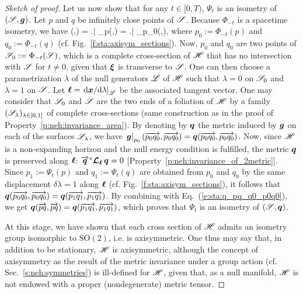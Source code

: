 \begin{proof}[Sketch of proof]
Let us now show that for any $t\in[0,T)$, %
$\Psi_t$ is an isometry of $(\mathscr{S},\bm{g})$.
Let $p$ and $q$ be infinitely close points of $\mathscr{S}$. Because $\Phi_{-t}$ is
a spacetime isometry, we have
\be \label{e:sta:q_pq_q0_p0q0}
 (,) = \left.\right| _p(,)
= \left.\right| _{p_0}(,),
\ee
where $p_0 := \Phi_{-t}(p)$ and $q_0 := \Phi_{-t}(q)$ (cf. Fig.~\ref{f:sta:axisym_sections}).
Now, $p_0$ and $q_0$ are two points of $\mathscr{S}_0 := \Phi_{-t}(\mathscr{S})$, which
is a complete cross-section of $\mathscr{H}$ that has no intersection with $\mathscr{S}$ for $t\neq 0$, given that $\bm{\xi}$ is transverse to $\mathscr{S}$. One can then
choose a parametrization $\lambda$ of the null generators $\mathscr{L}$ of $\mathscr{H}$
such that $\lambda=0$ on $\mathscr{S}_0$ and $\lambda=1$ on $\mathscr{S}$. Let
$\bm{\ell} = \left. \mathrm{d}\bm{x}/\mathrm{d}\lambda \right| _{\mathscr{L}}$ be the associated tangent vector.
One may consider that $\mathscr{S}_0$ and $\mathscr{S}$ are the two ends of a foliation of $\mathscr{H}$
by a family $(\mathscr{S}_\lambda)_{\lambda\in[0,1]}$ of complete cross-sections
(same construction as in the proof of Property~\ref{p:neh:invariance_area}).
By denoting by $\bm{q}$ the metric induced by $\bm{g}$ on each of the surfaces
$\mathscr{S}_\lambda$, we have $\left.\bm{g}\right| _{p_0}(\overrightarrow{p_0q_0},\overrightarrow{p_0q_0}) = \bm{q}(\overrightarrow{p_0q_0},\overrightarrow{p_0q_0})$. Now, since $\mathscr{H}$ is a non-expanding horizon and the null
energy condition is fulfilled, the metric $\bm{q}$ is preserved along
$\bm{\ell}$: $\overrightarrow{\bm{q}}^* \bm{\mathcal{L}}_{\bm{\ell}}\, \bm{q} = 0$ [Property~\ref{p:neh:invariance_of_2metric}]. Since $p_1:= \Psi_t(p)$ and $q_1:=\Psi_t(q)$
are obtained from $p_0$ and $q_0$ by the same displacement $\delta\lambda=1$
along $\bm{\ell}$ (cf. Fig.~\ref{f:sta:axisym_sections}),
it follows that $\bm{q}(\overrightarrow{p_0q_0},\overrightarrow{p_0q_0}) =  \bm{q}(\overrightarrow{p_1 q_1},\overrightarrow{p_1 q_1})$.
By combining with Eq.~(\ref{e:sta:q_pq_q0_p0q0}), we get
$\bm{q}(\overrightarrow{pq},\overrightarrow{pq}) = \bm{q}(\overrightarrow{p_1q_1},\overrightarrow{p_1q_1})$, which proves that
$\Psi_t$ is an isometry of $(\mathscr{S}, \bm{q})$.

At this stage, we have shown that each cross section of $\mathscr{H}$ admits an
isometry group isomorphic to $\mathrm{SO}(2)$, i.e. is axisymmetric.
One thus may say that, in addition to be stationary,
$\mathscr{H}$ is axisymmetric, although the concept of axisymmetry as the result of the
metric invariance under a group action (cf. Sec.~\ref{s:neh:symmetries})
is ill-defined for $\mathscr{H}$, given that, as a null manifold, $\mathscr{H}$
is not endowed with a proper (nondegenerate) metric tensor.


\end{proof}
